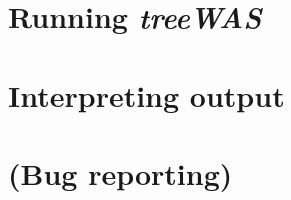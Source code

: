 \documentclass[11pt]{report}
\begin{document}
\section{Running \textit{treeWAS}}



\section{Interpreting output}


\section{(Bug reporting)}


\end{document}
